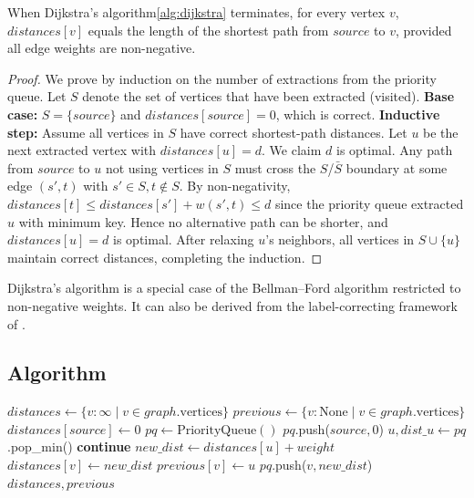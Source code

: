 \begin{theorem}\label{thm:dijkstra_correctness}
When Dijkstra's algorithm\cref{alg:dijkstra} terminates, for every vertex $v$, $distances[v]$ equals the length of the shortest path from $source$ to $v$, provided all edge weights are non-negative.
\end{theorem}
\begin{proof}
We prove by induction on the number of extractions from the priority queue. Let $S$ denote the set of vertices that have been extracted (visited). \textbf{Base case:} $S = \{source\}$ and $distances[source] = 0$, which is correct. \textbf{Inductive step:} Assume all vertices in $S$ have correct shortest-path distances. Let $u$ be the next extracted vertex with $distances[u] = d$. We claim $d$ is optimal. Any path from $source$ to $u$ not using vertices in $S$ must cross the $S$/$\bar{S}$ boundary at some edge $(s', t)$ with $s' \in S, t \notin S$. By non-negativity, $distances[t] \le distances[s'] + w(s',t) \le d$ since the priority queue extracted $u$ with minimum key. Hence no alternative path can be shorter, and $distances[u] = d$ is optimal. After relaxing $u$'s neighbors, all vertices in $S \cup \{u\}$ maintain correct distances, completing the induction.
\end{proof}

\begin{remark}
Dijkstra's algorithm is a special case of the Bellman--Ford algorithm restricted to non-negative weights. It can also be derived from the label-correcting framework of \cite{cormen2009}.
\end{remark}

\subsection{Algorithm}
\begin{algorithm}
\caption{Dijkstra's Shortest Path Algorithm\label{alg:dijkstra}}
\begin{algorithmic}[1]
  \State $distances \gets \{v : \infty \mid v \in graph.\text{vertices}\}$
  \State $previous \gets \{v : \text{None} \mid v \in graph.\text{vertices}\}$
  \State $distances[source] \gets 0$
  \State $pq \gets \text{PriorityQueue}()$
  \State $pq$.push($source, 0$)
    \State $u, dist\_u \gets pq$.pop\_min()
     \textbf{continue}
    \EndIf
      \State $new\_dist \gets distances[u] + weight$
        \State $distances[v] \gets new\_dist$
        \State $previous[v] \gets u$
        \State $pq$.push($v, new\_dist$)
      \EndIf
    \EndFor
  \EndWhile
  \State \Return $distances, previous$
\EndFunction
\end{algorithmic}
\end{algorithm}

